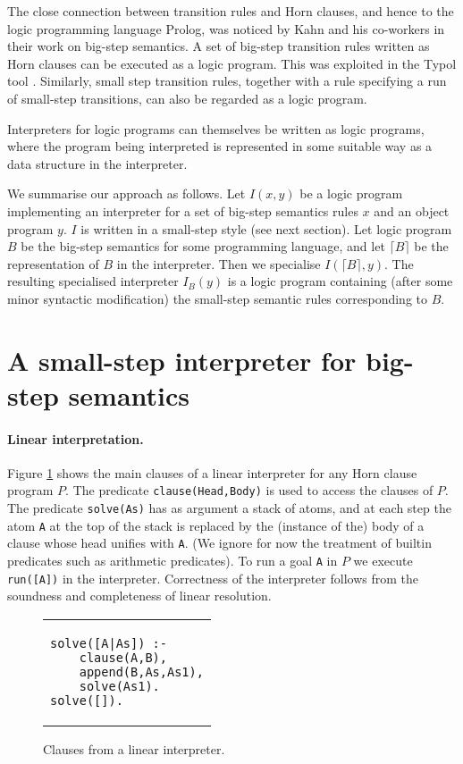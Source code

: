 \documentclass{llncs}
\begin{document}
The close connection between transition rules and Horn clauses, and hence to the logic programming language Prolog, 
was noticed by Kahn and his co-workers in their work on big-step semantics.
A set of big-step transition rules written as Horn clauses can be executed as a logic program. This was exploited in
the Typol tool \cite{Typol}. Similarly, small step transition rules, together with a rule specifying a run of
small-step transitions, can also be regarded as a logic program.

Interpreters for logic programs can themselves be written as logic programs, where the program being interpreted 
is represented in some suitable way as a data structure in the interpreter.  

We summarise our approach as follows.  Let $I(x,y)$ be a logic program implementing an interpreter for a set of
big-step semantics rules $x$ and an object program $y$. $I$ is written in a small-step style (see next section).  Let logic program $B$ be the big-step semantics
for some programming language, and let $\lceil B \rceil$ be the representation of $B$ in the interpreter.  Then we specialise 
$I(\lceil B \rceil,y)$.  The resulting specialised interpreter $I_B(y)$ is a logic program containing (after some minor syntactic modification) 
the small-step semantic rules
corresponding to $B$.

\section{A small-step interpreter for big-step semantics}\label{small-step-interp}

\paragraph{Linear interpretation.}  Figure \ref{fig:linear-interp} shows the main clauses of a linear interpreter for any Horn clause program $P$.  
The predicate \texttt{clause(Head,Body)} is used to access the clauses of $P$.  The predicate \texttt{solve(As)} has as argument a stack of atoms, and
at each step the atom  \texttt{A} at the top of the stack is replaced by the (instance of the) body of a clause whose head unifies with \texttt{A}.
(We ignore for now the treatment of builtin predicates such as arithmetic predicates).
To run a goal \texttt{A} in $P$ we execute \texttt{run([A])} in the interpreter.  
Correctness of the interpreter follows from the soundness and completeness of linear resolution.
\begin{figure}
\begin{tabular}{l}
\begin{lstlisting}
solve([A|As]) :- 
    clause(A,B),
    append(B,As,As1),
    solve(As1).
solve([]).
\end{lstlisting}
\end{tabular}
\caption{Clauses from a linear interpreter.}\label{fig:linear-interp}
\end{figure}
\end{document}
